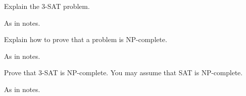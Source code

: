 \begin{questions}
\question
Explain the 3-SAT problem.
\begin{solution}
As in notes.
\end{solution}

\question
Explain how to prove that a problem is NP-complete.
\begin{solution}
As in notes.
\end{solution}


\question
Prove that 3-SAT is NP-complete. You may assume that SAT is NP-complete.
\begin{solution}
As in notes.
\end{solution}

\end{questions}

